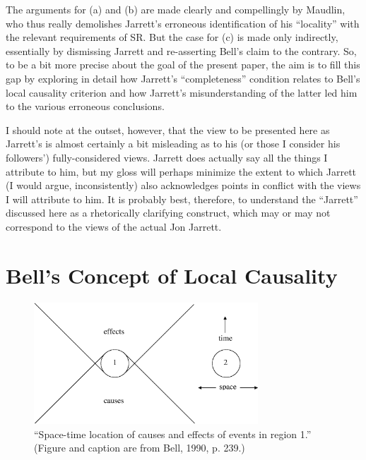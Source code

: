 \documentclass[aps,prc,twocolumn]{revtex4}
\begin{document}
The arguments for (a) and (b) are made clearly and compellingly by
Maudlin, who thus really demolishes Jarrett's erroneous identification
of his ``locality'' with the relevant requirements of SR.  But the
case for (c) is made only indirectly, essentially by dismissing
Jarrett and re-asserting Bell's claim to the contrary.  So, to be a
bit more precise about the goal of the present paper, the aim is to
fill this gap by exploring in detail how Jarrett's ``completeness''
condition relates to Bell's local causality criterion and how Jarrett's
misunderstanding of the latter led him to the various erroneous
conclusions.  

I should note at the outset, however, that the view to be presented
here as Jarrett's is almost certainly a bit misleading as to his 
(or those I consider his followers') fully-considered views.  Jarrett
does actually say all the things I attribute to him, but my gloss will
perhaps minimize the extent to which Jarrett (I would argue,
inconsistently) also acknowledges points in conflict with the views I
will attribute to him.  It is probably best, therefore, to understand
the ``Jarrett'' discussed here as a rhetorically clarifying construct,
which may or may not correspond to the views of the actual Jon
Jarrett.



\section{Bell's Concept of Local Causality}



\begin{figure}[t]
\begin{center}
\includegraphics[width=3.3in,clip]{./fig1.eps}
\end{center}
\caption{
\label{fig1}
``Space-time location of causes and effects of events in region 1.''
(Figure and caption are from Bell, 1990, p. 239.)
}
\end{figure}
\end{document}
